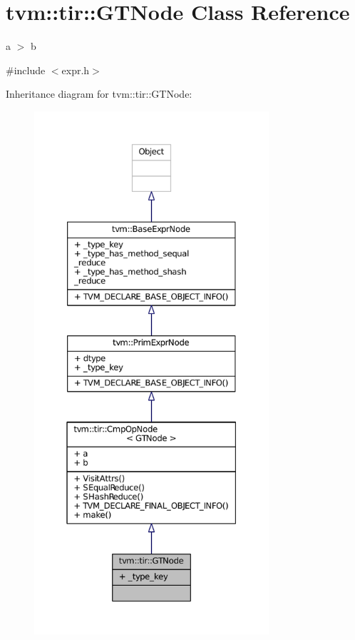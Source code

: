 \hypertarget{classtvm_1_1tir_1_1GTNode}{}\section{tvm\+:\+:tir\+:\+:G\+T\+Node Class Reference}
\label{classtvm_1_1tir_1_1GTNode}


a $>$ b  




{\ttfamily \#include $<$expr.\+h$>$}



Inheritance diagram for tvm\+:\+:tir\+:\+:G\+T\+Node\+:
\nopagebreak
\begin{figure}[H]
\begin{center}
\leavevmode
\includegraphics[height=550pt]{classtvm_1_1tir_1_1GTNode__inherit__graph}
\end{center}
\end{figure}


